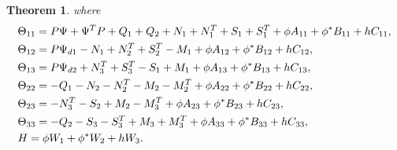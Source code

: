 \documentclass[a4paper]{cas-sc}
\newtheorem{theorem}{Theorem}
\begin{document}
\begin{theorem}
  where
  \begin{equation*}
    \begin{gathered}
      {\Theta _{11}} = P\Psi  + {\Psi ^T}P + {Q_1} + {Q_2} + {N_1} + N_1^{T} + {S_1} + S_1^{T} + \phi {A_{11}} + {\phi ^*}{B_{11}} + h{C_{11}}, \hfill \\
      {\Theta _{12}} = P{\Psi _{d1}} - {N_1} + N_2^{T} + S_2^{T} - {M_1} + \phi {A_{12}} + {\phi ^*}{B_{12}} + h{C_{12}}, \hfill \\
      {\Theta _{13}} = P{\Psi _{d2}} + N_3^{T} + S_3^{T} - {S_1} + {M_1} + \phi {A_{13}} + {\phi ^*}{B_{13}} + h{C_{13}}, \hfill \\
      {\Theta _{22}} =  - {Q_1} - {N_2} - N_2^{T} - {M_2} - M_2^{T} + \phi {A_{22}} + {\phi ^*}{B_{22}} + h{C_{22}}, \hfill \\
      {\Theta _{23}} =  - N_3^{T} - {S_2} + {M_2} - M_3^{T} + \phi {A_{23}} + {\phi ^*}{B_{23}} + h{C_{23}}, \hfill \\
      {\Theta _{33}} =  - {Q_2} - {S_3} - S_3^{T} + {M_3} + M_3^{T} + \phi {A_{33}} + {\phi ^*}{B_{33}} + h{C_{33}}, \hfill \\
      H = \phi {W_1} + {\phi ^*}{W_2} + h{W_3}. \hfill \\
    \end{gathered}
  \end{equation*}
  \label{theorem4}
\end{theorem}
\end{document}
